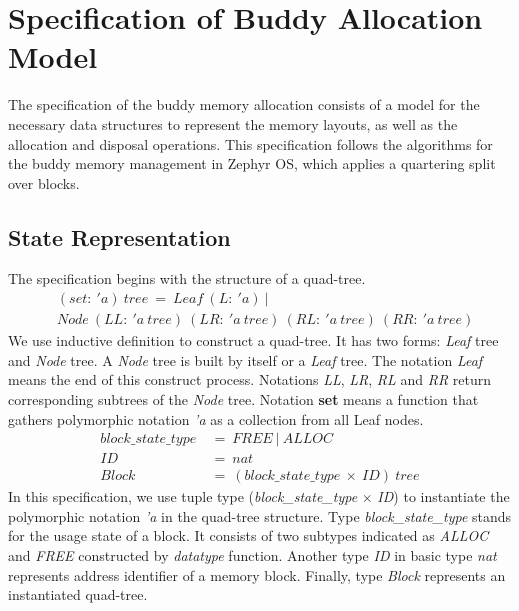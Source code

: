 \section{Specification of Buddy Allocation Model}
The specification of the buddy memory allocation consists of a model for the necessary data structures to represent the memory layouts, as well as the allocation and disposal operations. This specification follows the algorithms for the buddy memory management in Zephyr OS, which applies a quartering split over blocks.

\subsection{State Representation}
\label{statedes}
The specification begins with the structure of a quad-tree.
{\footnotesize
\begin{align*}
&(set:\ 'a)\ tree\ =\ Leaf\ (L:\ 'a)\ | \\
&Node\ (LL:\ 'a\ tree)\ (LR:\ 'a\ tree)\ (RL:\ 'a\ tree)\ (RR:\ 'a\ tree)
\end{align*}
}
We use inductive definition to construct a quad-tree. It has two forms: \emph{Leaf} tree and \emph{Node} tree. A \emph{Node} tree is built by itself or a \emph{Leaf} tree. The notation \emph{Leaf} means the end of this construct process. Notations \emph{LL}, \emph{LR}, \emph{RL} and \emph{RR} return corresponding subtrees of the \emph{Node} tree. Notation \textbf{set} means a function that gathers polymorphic notation \emph{'a} as a collection from all Leaf nodes.
{\footnotesize
\begin{align*}
block\_state\_type\ &=\ FREE\ |\ ALLOC \\
ID\ &=\ nat \\
Block\ &=\ (block\_state\_type\ \times\ ID)\ tree
\end{align*}
}
In this specification, we use tuple type (\emph{block\_state\_type} $\times$ \emph{ID}) to instantiate the polymorphic notation \emph{'a} in the quad-tree structure. Type \emph{block\_state\_type} stands for the usage state of a block. It consists of two subtypes indicated as \emph{ALLOC} and \emph{FREE} constructed by \emph{datatype} function. Another type \emph{ID} in basic type \emph{nat} represents address identifier of a memory block. Finally, type \emph{Block} represents an instantiated quad-tree.

